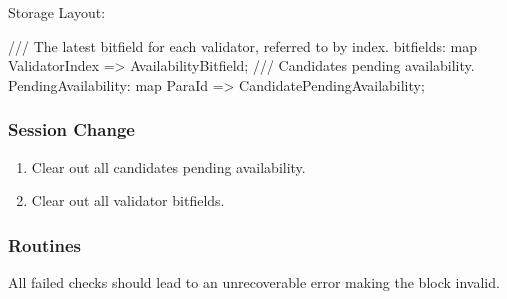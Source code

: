 Storage Layout:

\begin{verbnobox}[\small]
/// The latest bitfield for each validator, referred to by index.
bitfields: map ValidatorIndex => AvailabilityBitfield;
/// Candidates pending availability.
PendingAvailability: map ParaId => CandidatePendingAvailability;
\end{verbnobox}


\subsubsection{Session Change}

\begin{enumerate}
    \item Clear out all candidates pending availability.
    \item Clear out all validator bitfields.
\end{enumerate}

\subsubsection{Routines}

All failed checks should lead to an unrecoverable error making the block
invalid.

